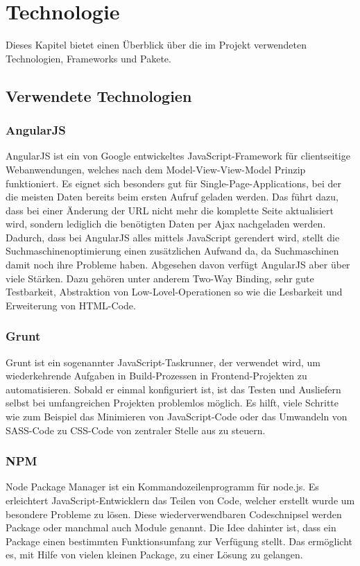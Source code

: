\chapter{Technologie}
\label{chap_2}

Dieses Kapitel bietet einen Überblick über die im Projekt verwendeten Technologien, Frameworks und Pakete.

\section{Verwendete Technologien}
\subsection{AngularJS}
AngularJS ist ein von Google entwickeltes JavaScript-Framework für clientseitige Webanwendungen,
welches nach dem Model-View-View-Model Prinzip funktioniert. Es eignet sich besonders gut für Single-Page-Applications,
bei der die meisten Daten bereits beim ersten Aufruf geladen werden. Das führt dazu, dass bei einer Änderung der URL nicht mehr die komplette Seite aktualisiert wird,
 sondern lediglich die benötigten Daten per Ajax nachgeladen werden.
 Dadurch, dass bei AngularJS alles mittels JavaScript gerendert wird, stellt die Suchmaschinenoptimierung einen zusätzlichen Aufwand da,
 da Suchmaschinen damit noch ihre Probleme haben. Abgesehen davon verfügt AngularJS aber über viele Stärken.
 Dazu gehören unter anderem Two-Way Binding, sehr gute Testbarkeit, Abstraktion von Low-Lovel-Operationen so wie die Lesbarkeit und Erweiterung von HTML-Code.

\subsection{Grunt}
Grunt ist ein sogenannter JavaScript-Taskrunner, der verwendet wird, um wiederkehrende Aufgaben in Build-Prozessen in Frontend-Projekten zu automatisieren.
Sobald er einmal konfiguriert ist, ist das Testen und Ausliefern selbst bei umfangreichen Projekten problemlos möglich.
Es hilft, viele Schritte wie zum Beispiel das Minimieren von JavaScript-Code oder das Umwandeln von SASS-Code zu CSS-Code von zentraler Stelle aus zu steuern.

\subsection{NPM}
Node Package Manager ist ein Kommandozeilenprogramm für node.js. Es erleichtert JavaScript-Entwicklern das Teilen von Code, welcher erstellt wurde um besondere Probleme zu lösen.
Diese wiederverwendbaren Codeschnipsel werden Package oder manchmal auch Module genannt. Die Idee dahinter ist, dass ein Package einen bestimmten Funktionsumfang zur Verfügung stellt.
Das ermöglicht es, mit Hilfe von vielen kleinen Package, zu einer Lösung zu gelangen.
  

